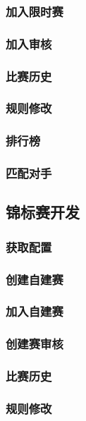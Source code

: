 \documentclass[11pt]{article}
\begin{document}
\subsubsection{加入限时赛}
\label{sec:orgcd0f50c}
\subsubsection{加入审核}
\label{sec:org113742c}
\subsubsection{比赛历史}
\label{sec:org16e303b}
\subsubsection{规则修改}
\label{sec:org4ac317c}
\subsubsection{排行榜}
\label{sec:org019d863}
\subsubsection{匹配对手}
\label{sec:org5f7bad8}


\subsection{锦标赛开发}
\label{sec:org9bc090c}
\subsubsection{获取配置}
\label{sec:org4bb83fb}
\subsubsection{创建自建赛}
\label{sec:org4054bd5}
\subsubsection{加入自建赛}
\label{sec:org491e990}
\subsubsection{创建赛审核}
\label{sec:org4bdfb43}
\subsubsection{比赛历史}
\label{sec:org7571f26}
\subsubsection{规则修改}
\label{sec:orgbb6d64d}
\end{document}
